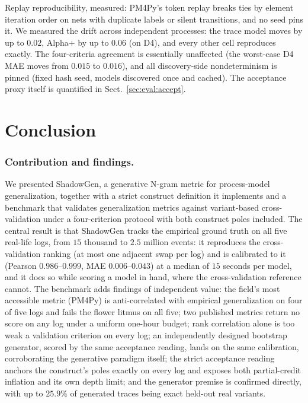 \documentclass[runningheads]{llncs}
\newcommand{\chg}[1]{\textcolor{chgblue}{#1}}
\begin{document}
\chg{Replay reproducibility, measured: PM4Py's token replay breaks ties by element iteration order on nets with duplicate labels or silent transitions, and no seed pins it. We measured the drift across independent processes: the trace model moves by up to $0.02$, Alpha+ by up to $0.06$ (on D4), and every other cell reproduces exactly. The four-criteria agreement is essentially unaffected (the worst-case D4 MAE moves from $0.015$ to $0.016$), and all discovery-side nondeterminism is pinned (fixed hash seed, models discovered once and cached). The acceptance proxy itself is quantified in Sect.~\ref{sec:eval:accept}.}

\section{Conclusion}
\label{sec:conclusion}

\subsubsection{Contribution and findings.}
We presented ShadowGen, a generative N-gram metric for process-model generalization, together with a strict construct definition it implements and a benchmark that validates generalization metrics against variant-based cross-validation under a four-criterion protocol with both construct poles included. \chg{The central result is that ShadowGen tracks the empirical ground truth on all five real-life logs, from $15$ thousand to $2.5$ million events: it reproduces the cross-validation ranking (at most one adjacent swap per log) and is calibrated to it (Pearson $0.986$--$0.999$, MAE $0.006$--$0.043$) at a median of $15$ seconds per model, and it does so while scoring a model in hand, where the cross-validation reference cannot. The benchmark adds findings of independent value: the field's most accessible metric (PM4Py) is anti-correlated with empirical generalization on four of five logs and fails the flower litmus on all five; two published metrics return no score on any log under a uniform one-hour budget; rank correlation alone is too weak a validation criterion on every log; an independently designed bootstrap generator, scored by the same acceptance reading, lands on the same calibration, corroborating the generative paradigm itself; the strict acceptance reading anchors the construct's poles exactly on every log and exposes both partial-credit inflation and its own depth limit; and the generator premise is confirmed directly, with up to $25.9\%$ of generated traces being exact held-out real variants.}
\end{document}
